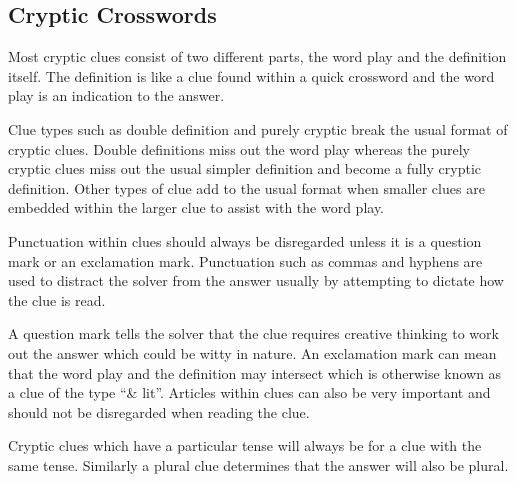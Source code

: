 \subsection{Cryptic Crosswords} 

Most cryptic clues consist of two different parts, the word play and the
definition itself. The definition is like a clue found within a quick crossword
and the word play is an indication to the answer.

Clue types such as double definition and purely cryptic break the usual format
of cryptic clues. Double definitions miss out the word play whereas the purely
cryptic clues miss out the usual simpler definition and become a fully cryptic
definition. Other types of clue add to the usual format when smaller clues are
embedded within the larger clue to assist with the word play.

Punctuation within clues should always be disregarded unless it is a question
mark or an exclamation mark. Punctuation such as commas and hyphens are used to
distract the solver from the answer usually by attempting to dictate how the
clue is read.

A question mark tells the solver that the clue requires creative thinking to
work out the answer which could be witty in nature. An exclamation mark can mean
that the word play and the definition may intersect which is otherwise known as
a clue of the type ``\& lit''. Articles within clues can also be very important
and should not be disregarded when reading the clue.

Cryptic clues which have a particular tense will always be for a clue with the
same tense. Similarly a plural clue determines that the answer will also be
plural.
